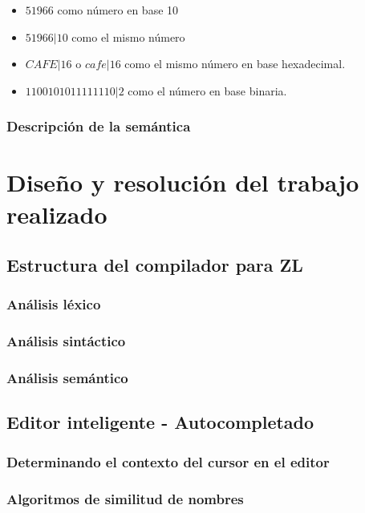 \documentclass{report}
\begin{document}
	\begin{itemize}
		\item $51966$ como número en base 10
		\item $51966|10$ como el mismo número
		\item $CAFE|16$ o $cafe|16$ como el mismo número en base hexadecimal.
		\item $1100101011111110|2$ como el número en base binaria.
	\end{itemize}
		
	
	\subsection{Descripción de la semántica}
	
		
	\chapter{Diseño y resolución del trabajo realizado}
	
	\section{Estructura del compilador para ZL}
	
	\subsection{Análisis léxico}
	
	\subsection{Análisis sintáctico}
	
	\subsection{Análisis semántico}
	
	\section{Editor inteligente - Autocompletado}
	
	\subsection{Determinando el contexto del cursor en el editor}
	
	\subsection{Algoritmos de similitud de nombres}
	
\end{document}
